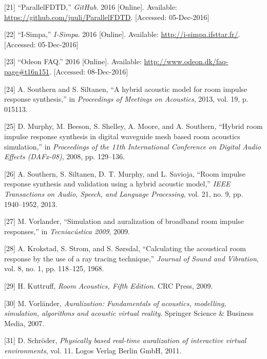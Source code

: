 \documentclass[]{scrreprt}
\begin{document}
\hypertarget{ref-ux5fparallelfdtdux5f2016}{}
{[}21{]} ``ParallelFDTD,'' \emph{GitHub}. 2016 {[}Online{]}. Available:
\url{https://github.com/juuli/ParallelFDTD}. {[}Accessed: 05-Dec-2016{]}

\hypertarget{ref-ux5fi-simpaux5f2016}{}
{[}22{]} ``I-Simpa,'' \emph{I-Simpa}. 2016 {[}Online{]}. Available:
\url{http://i-simpa.ifsttar.fr/}. {[}Accessed: 05-Dec-2016{]}

\hypertarget{ref-ux5fodeonux5f2016-1}{}
{[}23{]} ``Odeon FAQ.'' 2016 {[}Online{]}. Available:
\url{http://www.odeon.dk/faq-page\#t16n151}. {[}Accessed: 08-Dec-2016{]}

\hypertarget{ref-southernux5fhybridux5f2013}{}
{[}24{]} A. Southern and S. Siltanen, ``A hybrid acoustic model for room
impulse response synthesis,'' in \emph{Proceedings of Meetings on
Acoustics}, 2013, vol. 19, p. 015113.

\hypertarget{ref-murphyux5fhybridux5f2008}{}
{[}25{]} D. Murphy, M. Beeson, S. Shelley, A. Moore, and A. Southern,
``Hybrid room impulse response synthesis in digital waveguide mesh based
room acoustics simulation,'' in \emph{Proceedings of the 11th
International Conference on Digital Audio Effects (DAFx-08)}, 2008, pp.
129--136.

\hypertarget{ref-southernux5froomux5f2013}{}
{[}26{]} A. Southern, S. Siltanen, D. T. Murphy, and L. Savioja, ``Room
impulse response synthesis and validation using a hybrid acoustic
model,'' \emph{IEEE Transactions on Audio, Speech, and Language
Processing}, vol. 21, no. 9, pp. 1940--1952, 2013.

\hypertarget{ref-vorlanderux5fsimulationux5f2009}{}
{[}27{]} M. Vorlander, ``Simulation and auralization of broadband room
impulse responses,'' in \emph{Tecniacústica 2009}, 2009.

\hypertarget{ref-krokstadux5fcalculatingux5f1968}{}
{[}28{]} A. Krokstad, S. Strom, and S. Sørsdal, ``Calculating the
acoustical room response by the use of a ray tracing technique,''
\emph{Journal of Sound and Vibration}, vol. 8, no. 1, pp. 118--125,
1968.

\hypertarget{ref-kuttruffux5froomux5f2009}{}
{[}29{]} H. Kuttruff, \emph{Room Acoustics, Fifth Edition}. CRC Press,
2009.

\hypertarget{ref-vorlanderux5fauralization:ux5f2007}{}
{[}30{]} M. Vorländer, \emph{Auralization: Fundamentals of acoustics,
modelling, simulation, algorithms and acoustic virtual reality}.
Springer Science \& Business Media, 2007.

\hypertarget{ref-schroderux5fphysicallyux5f2011}{}
{[}31{]} D. Schröder, \emph{Physically based real-time auralization of
interactive virtual environments}, vol. 11. Logos Verlag Berlin GmbH,
2011.
\end{document}
